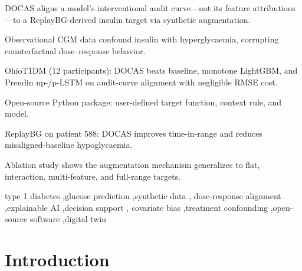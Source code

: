 \documentclass[a4paper,fleqn]{cas-sc}
\begin{document}
\begin{highlights}
\item DOCAS aligns a model's interventional audit curve---not its feature attributions---to a ReplayBG-derived insulin target via synthetic augmentation.
\item Observational CGM data confound insulin with hyperglycaemia, corrupting counterfactual dose--response behavior.
\item OhioT1DM (12 participants): DOCAS beats baseline, monotone LightGBM, and Prendin np-/p-LSTM on audit-curve alignment with negligible RMSE cost.
\item Open-source Python package: user-defined target function, context rule, and model.
\item ReplayBG on patient 588: DOCAS improves time-in-range and reduces misaligned-baseline hypoglycaemia.
\item Ablation study shows the augmentation mechanism generalizes to flat, interaction, multi-feature, and full-range targets.
\end{highlights}

\begin{keywords}
type 1 diabetes \sep glucose prediction \sep synthetic data \sep
dose-response alignment \sep explainable AI \sep decision support \sep
covariate bias \sep treatment confounding \sep open-source software \sep digital twin
\end{keywords}

\maketitle
\clearpage

\section{Introduction}\label{sec:introduction}
\end{document}
